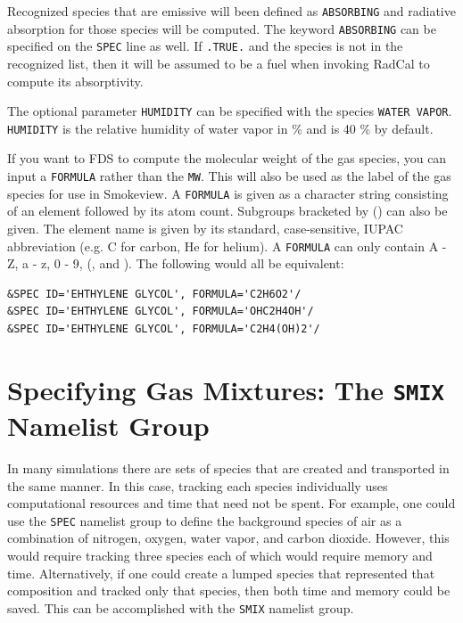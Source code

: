 \documentclass[11pt]{book}
\newcommand{\ct}{\tt\small}
\begin{document}
Recognized species that are emissive will been defined as {\ct ABSORBING} and radiative absorption for those species
will be computed.  The keyword {\ct ABSORBING} can be specified on the {\ct SPEC} line as well.  If {\ct .TRUE.} and the
species is not in the recognized list, then it will be assumed to be a fuel when invoking RadCal to compute its
absorptivity.

The optional parameter {\ct HUMIDITY} can be specified with the species {\ct WATER VAPOR}.  {\ct HUMIDITY} is the relative humidity of water vapor in \% and is 40 \% by default.

If you want to FDS to compute the molecular weight of the gas species, you can input a {\ct FORMULA} rather than the {\ct MW}.  This will also be used as the label of the gas species for use in Smokeview.  A {\ct FORMULA} is given as a character string consisting of an element followed by its atom count.  Subgroups bracketed by () can also be given.  The element name is given by its standard, case-sensitive, IUPAC abbreviation (e.g. C for carbon, He for helium).  A {\ct FORMULA} can only contain A - Z, a - z, 0 - 9, (, and ).  The following would all be equivalent:

\footnotesize
\begin{verbatim}
&SPEC ID='EHTHYLENE GLYCOL', FORMULA='C2H6O2'/
&SPEC ID='EHTHYLENE GLYCOL', FORMULA='OHC2H4OH'/
&SPEC ID='EHTHYLENE GLYCOL', FORMULA='C2H4(OH)2'/
\end{verbatim} \normalsize


\clearpage

\section{Specifying Gas Mixtures: The \texorpdfstring{{\tt SMIX}}{SMIX} Namelist Group}
\label{info:SMIX}

In many simulations there are sets of species that are created and transported in the same manner.
In this case, tracking each species individually uses computational resources and time that need not be spent.
For example, one could use the {\ct SPEC} namelist group to define the background species of air as a combination of nitrogen, oxygen, water vapor, and carbon dioxide.
However, this would require tracking three species each of which would require memory and time.
Alternatively, if one could create a lumped species that represented that composition and tracked only that species,
then both time and memory could be saved. This can be accomplished with the {\ct SMIX} namelist group.
\end{document}
